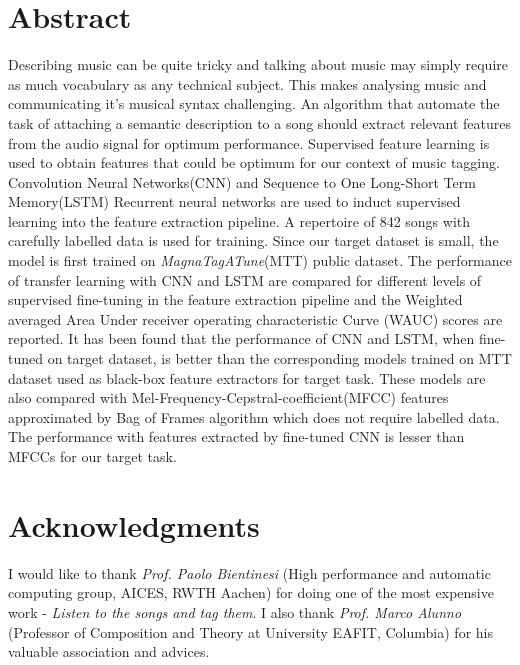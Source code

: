 \documentclass{book}
\begin{document}
\aicescoverpage


\section*{Abstract}

Describing music can be quite tricky and talking about music may simply require as much vocabulary as any technical subject. This makes analysing music and communicating it's musical syntax challenging. An algorithm that  automate the task of attaching a semantic description to a song should extract relevant features from the audio signal for optimum performance.
Supervised feature learning is used to obtain features that could be optimum for our context of music tagging. Convolution Neural Networks(CNN) and Sequence to One Long-Short Term Memory(LSTM) Recurrent neural networks are used to induct supervised learning into the feature extraction pipeline. A repertoire of 842 songs with carefully labelled data is used for training. Since our target dataset is small, the model is first trained on \textit{MagnaTagATune}(MTT) public dataset. The performance of transfer learning with CNN and LSTM are compared for different levels of supervised fine-tuning in the feature extraction pipeline and the Weighted averaged Area Under receiver operating characteristic Curve (WAUC) scores are reported. It has been found that the performance of CNN and LSTM, when fine-tuned on target dataset, is better than the corresponding models trained on MTT dataset used as black-box feature extractors for target task. These models are also compared with Mel-Frequency-Cepstral-coefficient(MFCC) features approximated by Bag of Frames algorithm which does not require labelled data. The performance with features extracted by fine-tuned CNN is lesser than MFCCs for our target task.   
  

\vspace{5cm}


\newpage

\section*{\bf Acknowledgments}
I would like to thank \textit{Prof. Paolo Bientinesi} (High performance and automatic computing group, AICES, RWTH Aachen) for doing one of the most expensive work - \textit{Listen to the songs and tag them}. I also thank  \textit{Prof. Marco Alunno} (Professor of Composition and Theory at University EAFIT, Columbia) for his valuable association and advices.  
\tableofcontents
\end{document}
